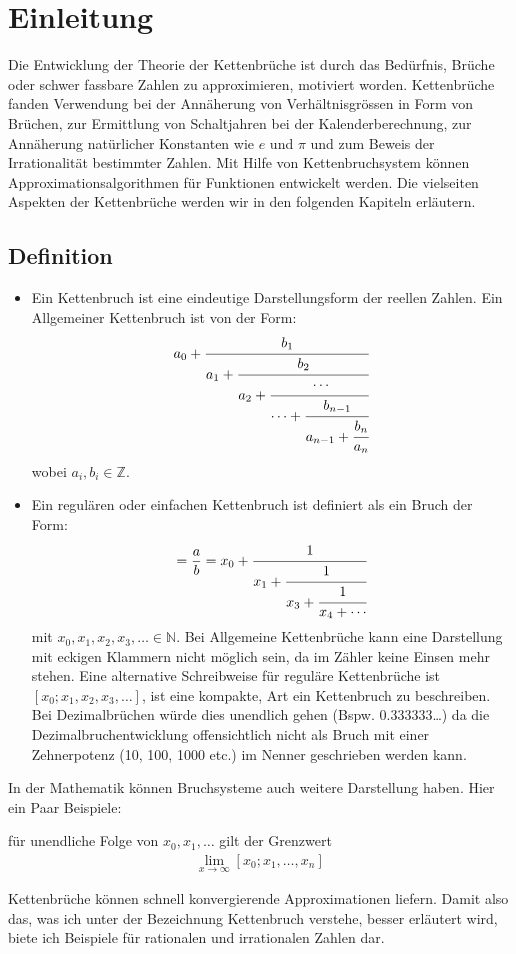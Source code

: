 %
%
%
\section{Einleitung\label{kettenbruch:section:einleitung}}
Die Entwicklung der Theorie der Kettenbrüche ist durch das Bedürfnis,
Brüche oder schwer fassbare Zahlen zu approximieren, motiviert
worden. Kettenbrüche fanden Verwendung bei der Annäherung von
Verhältnisgrössen in Form von Brüchen, zur Ermittlung von Schaltjahren
bei der Kalenderberechnung, zur Annäherung natürlicher Konstanten
wie $e$ und $\pi$ und zum Beweis der Irrationalität bestimmter
Zahlen. Mit Hilfe von Kettenbruchsystem können Approximationsalgorithmen 
für Funktionen entwickelt werden. Die vielseiten Aspekten der Kettenbrüche
werden wir in den folgenden Kapiteln erläutern.

\subsection{Definition\label{kettenbruch:section:1s}}
\begin{itemize}
\item
Ein Kettenbruch ist eine eindeutige Darstellungsform der reellen Zahlen. 
Ein Allgemeiner Kettenbruch ist von der Form:
\begin{equation}
a_0 + \cfrac{b_1}{a_1+\cfrac{b_2}{a_2+\cfrac{\cdots}{\cdots+\cfrac{b_{n-1}}{a_{n-1} + \cfrac{b_n}{a_n}}}}}
\end{equation}
wobei $a_i, b_i \in \mathbb{Z}$.
\item
Ein regulären oder einfachen Kettenbruch ist definiert als ein Bruch der Form:
\begin{align*}
[x_0;x_1,x_2,\cdots,x_n]
=
\frac{a}{b}=x_0+\cfrac{1}{x_1+\cfrac{1}{x_3+\cfrac{1}{x_4+\cdots}}}
\end{align*}
mit $x_0,x_1,x_2,x_3, \dots \in \mathbb{N}$.
Bei Allgemeine Kettenbrüche kann eine Darstellung mit eckigen Klammern nicht möglich sein, da im Zähler keine Einsen mehr stehen.
Eine alternative Schreibweise für reguläre Kettenbrüche ist $[x_0;x_1,x_2,x_3,\dots]$,
ist eine kompakte, Art ein Kettenbruch zu beschreiben. 
Bei Dezimalbrüchen würde dies unendlich gehen (Bspw. 0.333333\dots) da die Dezimalbruchentwicklung offensichtlich nicht als Bruch mit einer Zehnerpotenz (10, 100, 1000 etc.) im Nenner  geschrieben werden kann.
\end{itemize}

In der Mathematik können Bruchsysteme auch weitere Darstellung haben. 
Hier ein Paar Beispiele:

für unendliche Folge von $x_0,x_1,\dots$ gilt der Grenzwert
\begin{align*}
\lim_{x\to\infty} [x_0;x_1,\dots,x_n] 
\end{align*}  

Kettenbrüche können schnell konvergierende Approximationen liefern.
Damit also das, was ich unter der Bezeichnung Kettenbruch verstehe,
besser erläutert wird, biete ich Beispiele für
rationalen und irrationalen Zahlen dar.